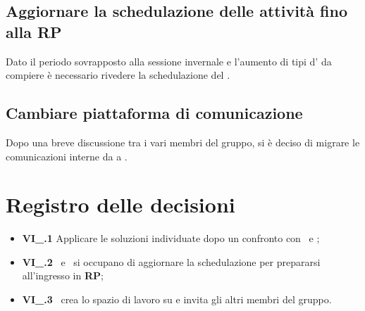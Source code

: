 \subsection{Aggiornare la schedulazione delle attività fino alla RP}
Dato il periodo sovrapposto alla sessione invernale e l'aumento di tipi d' da compiere è necessario rivedere la schedulazione del \PdP.
\subsection{Cambiare piattaforma di comunicazione}
Dopo una breve discussione tra i vari membri del gruppo, si è deciso di migrare le comunicazioni interne da  a .

\section{Registro delle decisioni}
\begin{itemize}
  \item \textbf{VI\_\Data.1} Applicare le soluzioni individuate dopo un confronto con \VT\ e \CR;
  \item \textbf{VI\_\Data.2} \MM\ e \TL\ si occupano di aggiornare la schedulazione per prepararsi all'ingresso in \textbf{RP};
  \item \textbf{VI\_\Data.3} \FF\ crea lo spazio di lavoro su  e invita gli altri membri del gruppo.
\end{itemize}